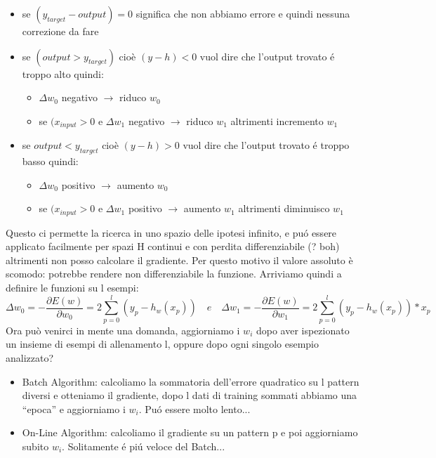 \documentclass{article}
\begin{document}
\begin{itemize}
    \item se $(y_{target}-output)=0$ significa che non abbiamo errore e quindi nessuna correzione da fare
    \item se $(output>y_{target})$ cioè $(y-h)<0$ vuol dire che l'output trovato é troppo alto quindi:
        \begin{itemize}
            \item $\Delta w_0$ negativo $\rightarrow$ riduco $w_0$
            \item se $(x_{input}>0$ e $\Delta w_1$ negativo $\rightarrow$ riduco $w_1$ altrimenti incremento $w_1$
        \end{itemize}
    \item se $output<y_{target}$ cioè $(y-h)>0$ vuol dire che l'output trovato é troppo basso quindi: %
        \begin{itemize}
            \item $\Delta w_0$ positivo $\rightarrow$ aumento $w_0$
            \item se $(x_{input}>0$ e $\Delta w_1$ positivo $\rightarrow$ aumento $w_1$ altrimenti diminuisco $w_1$
        \end{itemize}
\end{itemize}
Questo ci permette la ricerca in uno spazio delle ipotesi infinito, e puó essere applicato facilmente per spazi H continui e con perdita differenziabile (? boh) altrimenti non posso calcolare il gradiente. Per questo motivo il valore assoluto è scomodo: potrebbe rendere non differenziabile la funzione. \newline
Arriviamo quindi a definire le funzioni su l esempi:
\begin{equation}
    \Delta w_0 = - \frac{\partial E(w)}{\partial w_0} = 2 \sum_{p=0}^l (y_p - h_w(x_p)) \quad e \quad \Delta w_1 = - \frac{\partial E(w)}{\partial w_1} = 2 \sum_{p=0}^l (y_p - h_w(x_p)) * x_p
\end{equation}
Ora può venirci in mente una domanda, aggiorniamo i $w_i$ dopo aver ispezionato un insieme di esempi di allenamento l, oppure dopo ogni singolo esempio analizzato?
\begin{itemize}
    \item Batch Algorithm: calcoliamo la sommatoria dell'errore quadratico su l pattern diversi e otteniamo il gradiente, dopo l dati di training sommati abbiamo una “epoca” e aggiorniamo i $w_i$. Puó essere molto lento...
    \item On-Line Algorithm: calcoliamo il gradiente su un pattern p e poi aggiorniamo subito $w_i$. Solitamente é piú veloce del Batch...
\end{itemize}
\end{document}
